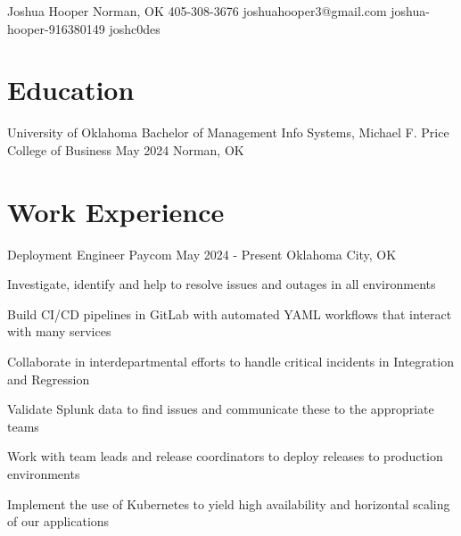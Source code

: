 \documentclass[letterpaper]{resumeconfig}
\begin{document}
\Header
    {Joshua Hooper} %
    {Norman, OK} %
    {405-308-3676} %
    {joshuahooper3@gmail.com} %
    {joshua-hooper-916380149} %
    {joshc0des} %


\section{Education}

\Education
    {University of Oklahoma} %
    {Bachelor of Management Info Systems, Michael F. Price College of Business} %
    {May 2024} %
    {Norman, OK} %
    \vspace{-1em}


\section{Work Experience}

\WorkExperience
	{Deployment Engineer} %
	{Paycom} %
	{May 2024 - Present} %
	{Oklahoma City, OK} %
	{
		\item Investigate, identify and help to resolve issues and outages in all environments
		\item Build CI/CD pipelines in GitLab with automated YAML workflows that interact with many services
		\item Collaborate in interdepartmental efforts to handle critical incidents in Integration and Regression
		\item Validate Splunk data to find issues and communicate these to the appropriate teams
		\item Work with team leads and release coordinators to deploy releases to production environments
		\item Implement the use of Kubernetes to yield high availability and horizontal scaling of our applications
	}
	\vspace{1em}
\end{document}
